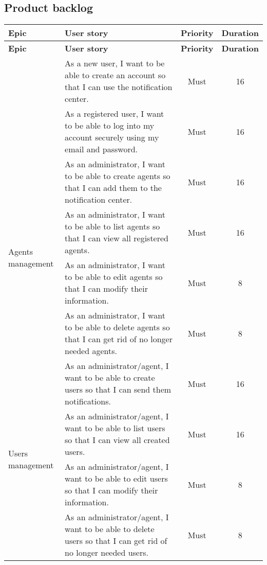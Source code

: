 \subsection{Product backlog}

\begin{longtable}{ | m{}  | m{} | c | c | }
        \hline
        \textbf{Epic} & \textbf{User story} & \textbf{Priority} & \textbf{Duration} \\
        \hline
        \endfirsthead
        \hline
        \textbf{Epic} & \textbf{User story} & \textbf{Priority} & \textbf{Duration} \\
        \hline  
        \endhead
        \hline
        \endfoot
        \endlastfoot
        \multirow{2}{5em}{Authentication} & As a new user, I want to be able to create an account so that I can use the notification center. & Must & 16 \\
        \cline{2-4}
        & As a registered user, I want to be able to log into my account securely using my email and password. & Must & 16 \\
        \hline
        \multirow{4}{5em}{Agents management} & As an administrator, I want to be able to create agents so that I can add them to the notification center. & Must & 16 \\
        \cline{2-4}
        & As an administrator, I want to be able to list agents so that I can view all registered agents. & Must & 16 \\
        \cline{2-4}
        & As an administrator, I want to be able to edit agents so that I can modify their information. & Must & 8 \\
        \cline{2-4}
        & As an administrator, I want to be able to delete agents so that I can get rid of no longer needed agents. & Must & 8 \\
        \hline
        \multirow{4}{5em}{Users management} & As an administrator/agent, I want to be able to create users so that I can send them notifications. & Must & 16 \\
        \cline{2-4}
        & As an administrator/agent, I want to be able to list users so that I can view all created users. & Must & 16 \\
        \cline{2-4}
        & As an administrator/agent, I want to be able to edit users so that I can modify their information. & Must & 8 \\
        \cline{2-4}
        &  As an administrator/agent, I want to be able to delete users so that I can get rid of no longer needed users. & Must & 8 \\

\end{longtable}
